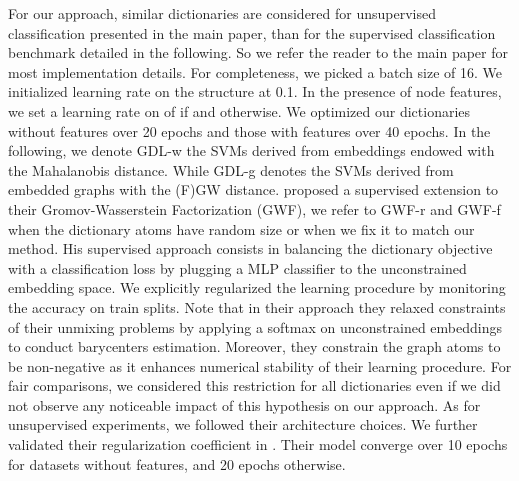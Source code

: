 \documentclass{article}
\begin{document}
	For our approach, similar dictionaries are considered for unsupervised classification presented in the main paper, than for the supervised classification benchmark detailed in the following. So we refer the reader to the main paper for most implementation details. For completeness, we picked a batch size of 16. We initialized learning rate on the structure  at 0.1. In the presence of node features, we set a learning rate on  of  if  and  otherwise. We optimized our dictionaries without features over 20 epochs and those with features over 40 epochs. In the following,  we denote GDL-w the SVMs derived from embeddings  endowed with the Mahalanobis distance. While GDL-g denotes the SVMs derived from embedded graphs with the (F)GW distance. \citep{xu_gromov-wasserstein_2019} proposed a supervised extension to their Gromov-Wasserstein Factorization (GWF), we refer to GWF-r and GWF-f when the dictionary atoms have random size or when we fix it to match our method. His supervised approach consists in balancing the dictionary objective with a classification loss by plugging a MLP classifier to the unconstrained embedding space. We explicitly regularized the learning procedure by monitoring the accuracy on train splits. Note that in their approach they relaxed constraints of their unmixing problems by applying a softmax on unconstrained embeddings to conduct barycenters estimation. Moreover, they constrain the graph atoms to be non-negative as it enhances numerical stability of their learning procedure. For fair comparisons, we considered this restriction for all dictionaries even if we did not observe any noticeable impact of this hypothesis on our approach. As for unsupervised experiments, we followed their architecture choices. We further validated their regularization coefficient in . Their model converge over 10 epochs for datasets without features, and 20 epochs otherwise.
	
\end{document}
